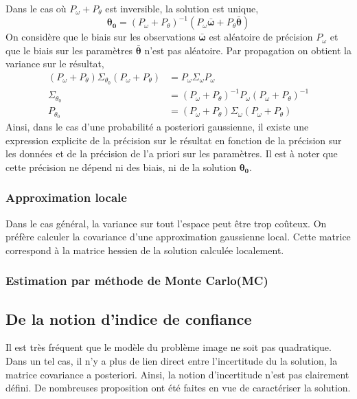 \documentclass[../main/These_Mathias_Paget.tex]{subfiles}
\begin{document}
Dans le cas où $P_\omega + P_\theta$ est inversible, la solution est unique,
\begin{equation}
\boldsymbol{{\theta}_0} = (P_\omega + P_\theta)^{-1}(  P_\omega \boldsymbol{\bar{\omega}} + P_\theta\boldsymbol{\bar{\theta}})
\end{equation}
On considère que le biais sur les observations $\boldsymbol{\bar{\omega}}$ est aléatoire de précision $P_\omega$ et que le biais sur les paramètres $\boldsymbol{\bar{\theta}}$ n'est pas aléatoire. Par propagation on obtient la variance sur le résultat,
\begin{equation}
\begin{aligned}
(P_\omega + P_\theta)\Sigma_{{\theta}_0} (P_\omega + P_\theta) & =  P_\omega  \Sigma_{\omega} P_\omega \\
\Sigma_{{\theta}_0} &= (P_\omega + P_\theta)^{-1} P_\omega (P_\omega + P_\theta)^{-1} \\
P_{{\theta}_0} &= (P_\omega + P_\theta) \Sigma_\omega (P_\omega + P_\theta)
\end{aligned}
\end{equation}
Ainsi, dans le cas d'une probabilité a posteriori gaussienne, il existe une expression explicite de la précision sur le résultat en fonction de la précision sur les données et de la précision de l'a priori sur les paramètres. Il est à noter que cette précision ne dépend ni des biais, ni de la solution $\boldsymbol{\theta_0}$.

\subsubsection{Approximation locale}

Dans le cas général, la variance sur tout l'espace peut être trop coûteux. On préfère calculer la covariance d'une approximation gaussienne local. Cette matrice correspond à la matrice hessien de la solution calculée localement.

\subsubsection{Estimation par méthode de Monte Carlo(MC)}

\subsection{De la notion d'indice de confiance}

Il est très fréquent que le modèle du problème image ne soit pas quadratique. Dans un tel cas, il n'y a plus de lien direct entre l'incertitude du la solution, la matrice covariance a posteriori. Ainsi, la notion d'incertitude n'est pas clairement défini. De nombreuses proposition ont été faites en vue de caractériser la solution.
\end{document}
